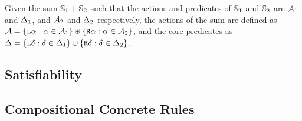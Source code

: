 Given the sum $\mathbb S_1 + \mathbb S_2$ such that the actions and predicates of $\mathbb S_1$ and $\mathbb S_2$ are ${\cal{A}}_1$ and $\Delta_1$, and ${\cal{A}}_2$ and $\Delta_2$ respectively, the actions of the sum are defined as ${{\cal{A}} = \{\texttt{L}\alpha : \alpha \in {\ensuremath{\cal{A}}}_1 \} \uplus \{\texttt{R}\alpha : \alpha \in {\ensuremath{\cal{A}}}_2 \}}$, and the core predicates as ${\Delta = \{\texttt{L}\delta : \delta \in \Delta_1 \} \uplus \{\texttt{R}\delta : \delta \in \Delta_2 \}}$.

\subsection{Satisfiability}


\subsection{Compositional Concrete Rules}

